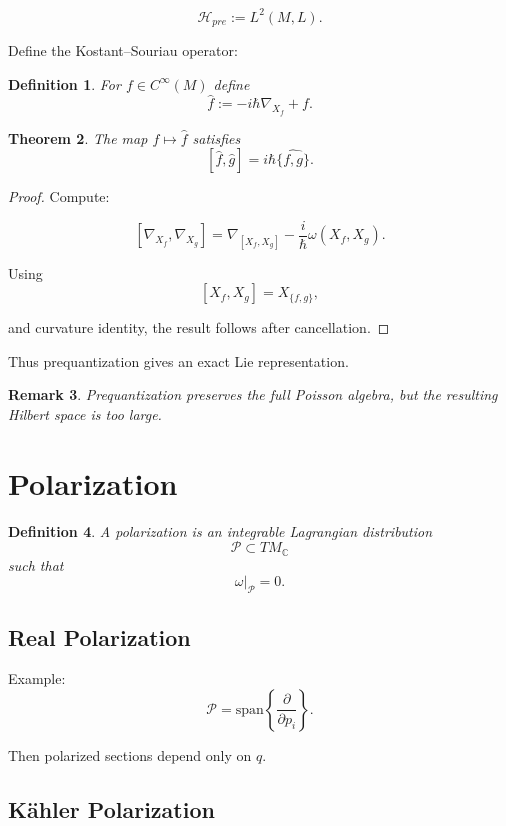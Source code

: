\documentclass[11pt]{book}
\newtheorem{theorem}{Theorem}[chapter]
\newtheorem{definition}[theorem]{Definition}
\newtheorem{remark}[theorem]{Remark}
\begin{document}
\[
\mathcal{H}_{pre} := L^2(M, L).
\]

Define the Kostant--Souriau operator:

\begin{definition}
For $f \in C^\infty(M)$ define
\[
\hat f := -i\hbar \nabla_{X_f} + f.
\]
\end{definition}

\begin{theorem}
The map $f \mapsto \hat f$ satisfies
\[
[\hat f, \hat g]
=
i\hbar \widehat{\{f,g\}}.
\]
\end{theorem}

\begin{proof}
Compute:

\[
[\nabla_{X_f}, \nabla_{X_g}]
=
\nabla_{[X_f,X_g]} - \frac{i}{\hbar}\omega(X_f,X_g).
\]

Using
\[
[X_f,X_g] = X_{\{f,g\}},
\]

and curvature identity,
the result follows after cancellation.
\end{proof}

Thus prequantization gives an exact Lie representation.

\begin{remark}
Prequantization preserves the full Poisson algebra,
but the resulting Hilbert space is too large.
\end{remark}

\section{Polarization}

\begin{definition}
A polarization is an integrable Lagrangian distribution
\[
\mathcal{P} \subset TM_\mathbb{C}
\]
such that
\[
\omega|_{\mathcal{P}} = 0.
\]
\end{definition}

\subsection{Real Polarization}

Example:
\[
\mathcal{P} = \mathrm{span}\left\{ \frac{\partial}{\partial p_i} \right\}.
\]

Then polarized sections depend only on $q$.

\subsection{Kähler Polarization}
\end{document}
